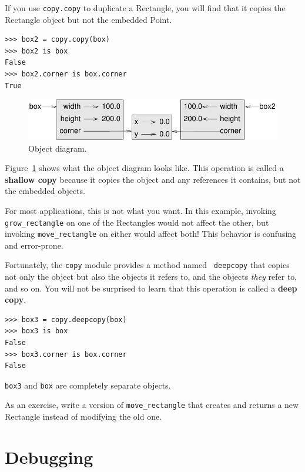 \documentclass[10pt]{book}
\begin{document}
If you use {\tt copy.copy} to duplicate a Rectangle, you will find
that it copies the Rectangle object but not the embedded Point.

\begin{verbatim}
>>> box2 = copy.copy(box)
>>> box2 is box
False
>>> box2.corner is box.corner
True
\end{verbatim}

\begin{figure}
\centerline
{\includegraphics[scale=0.8]{figs/rectangle2.pdf}}
\caption{Object diagram.}
\label{fig.rectangle2}
\end{figure}

Figure~\ref{fig.rectangle2} shows what the object diagram looks like.
This operation is called a {\bf shallow copy} because it copies the
object and any references it contains, but not the embedded objects.

For most applications, this is not what you want.  In this example,
invoking \verb"grow_rectangle" on one of the Rectangles would not
affect the other, but invoking \verb"move_rectangle" on either would
affect both!  This behavior is confusing and error-prone.

Fortunately, the {\tt copy} module provides a method named {\tt
deepcopy} that copies not only the object but also 
the objects it refers to, and the objects {\em they} refer to,
and so on.
You will not be surprised to learn that this operation is
called a {\bf deep copy}.

\begin{verbatim}
>>> box3 = copy.deepcopy(box)
>>> box3 is box
False
>>> box3.corner is box.corner
False
\end{verbatim}
%
{\tt box3} and {\tt box} are completely separate objects.

As an exercise, write a version of \verb"move_rectangle" that creates and
returns a new Rectangle instead of modifying the old one.


\section{Debugging}
\label{hasattr}
\end{document}
